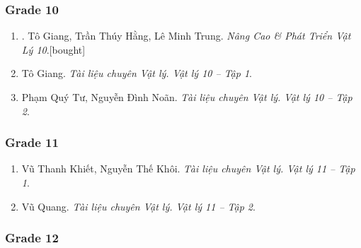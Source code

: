 \documentclass{article}
\begin{document}
\subsubsection{Grade 10}

\begin{enumerate}
	\item \cite{Giang_Hang_Trung2022}. Tô Giang, Trần Thúy Hằng, Lê Minh Trung. \textit{Nâng Cao \& Phát Triển Vật Lý 10}.\hfill\textsf{[bought]}
	\item Tô Giang. \textit{Tài liệu chuyên Vật lý. Vật lý 10 -- Tập 1}.
	\item Phạm Quý Tư, Nguyễn Đình Noãn. \textit{Tài liệu chuyên Vật lý. Vật lý 10 -- Tập 2}.
\end{enumerate}

\subsubsection{Grade 11}

\begin{enumerate}
	\item Vũ Thanh Khiết, Nguyễn Thế Khôi. \textit{Tài liệu chuyên Vật lý. Vật lý 11 -- Tập 1}.
	\item Vũ Quang. \textit{Tài liệu chuyên Vật lý. Vật lý 11 -- Tập 2}.
\end{enumerate}

\subsubsection{Grade 12}
\end{document}
